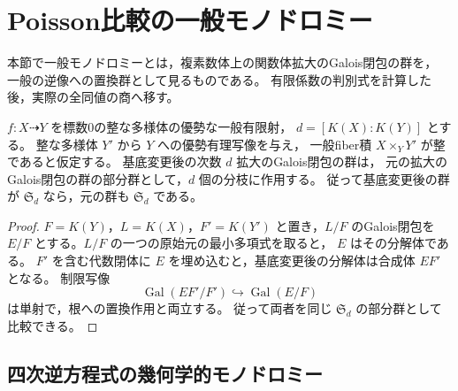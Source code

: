 \section{Poisson比較の一般モノドロミー}
\label{sec:shadow-monodromy}

本節で一般モノドロミーとは，複素数体上の関数体拡大のGalois閉包の群を，
一般の逆像への置換群として見るものである。
有限係数の判別式を計算した後，実際の全同値の商へ移す。

\begin{lemma}[基底変更による一般モノドロミーの包含]
\label{lem:degree-four-monodromy-base-change}
$f:X\dashrightarrow Y$ を標数0の整な多様体の優勢な一般有限射，
$d=[K(X):K(Y)]$ とする。
整な多様体 $Y'$ から $Y$ への優勢有理写像を与え，
一般fiber積 $X\times_Y Y'$ が整であると仮定する。
基底変更後の次数 $d$ 拡大のGalois閉包の群は，
元の拡大のGalois閉包の群の部分群として，$d$ 個の分枝に作用する。
従って基底変更後の群が $\mathfrak S_d$ なら，元の群も $\mathfrak S_d$ である。
\end{lemma}
\begin{proof}
$F=K(Y)$，$L=K(X)$，$F'=K(Y')$ と置き，$L/F$ のGalois閉包を
$E/F$ とする。$L/F$ の一つの原始元の最小多項式を取ると，
$E$ はその分解体である。
$F'$ を含む代数閉体に $E$ を埋め込むと，基底変更後の分解体は合成体 $EF'$ となる。
制限写像
\[
 \operatorname{Gal}(EF'/F')\hookrightarrow\operatorname{Gal}(E/F)
\]
は単射で，根への置換作用と両立する。
従って両者を同じ $\mathfrak S_d$ の部分群として比較できる。
\end{proof}

\subsection{四次逆方程式の幾何学的モノドロミー}
\label{subsec:binary-shadow-geometric-monodromy}

